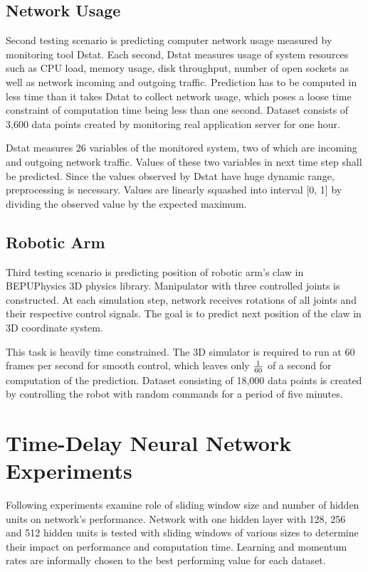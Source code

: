 \documentclass[12pt,oneside]{fithesis2}
\begin{document}
\subsection{Network Usage}
Second testing scenario is predicting computer network usage measured by monitoring tool Dstat. Each second, Dstat measures usage of system resources such as CPU load, memory usage, disk throughput, number of open sockets as well as network incoming and outgoing traffic. Prediction has to be computed in less time than it takes Dstat to collect network usage, which poses a loose time constraint of computation time being less than one second. Dataset consists of 3,600 data points created by monitoring real application server for one hour.\par
Dstat measures 26 variables of the monitored system, two of which are incoming and outgoing network traffic. Values of these two variables in next time step shall be predicted. Since the values observed by Dstat have huge dynamic range, preprocessing is necessary. Values are linearly squashed into interval [0, 1] by dividing the observed value by the expected maximum.
\subsection{Robotic Arm}
Third testing scenario is predicting position of robotic arm's claw in BEPUPhysics 3D physics library. Manipulator with three controlled joints is constructed. At each simulation step, network receives rotations of all joints and their respective control signals. The goal is to predict next position of the claw in 3D coordinate system.\par
This task is heavily time constrained. The 3D simulator is required to run at 60 frames per second for smooth control, which leaves only $1 \over 60$ of a second for computation of the prediction. Dataset consisting of 18,000 data points is created by controlling the robot with random commands for a period of five minutes.

\section{Time-Delay Neural Network Experiments}
Following experiments examine role of sliding window size and number of hidden units on network's performance. Network with one hidden layer with 128, 256 and 512 hidden units is tested with sliding windows of various sizes to determine their impact on performance and computation time. Learning and momentum rates are informally chosen to the best performing value for each dataset.
\end{document}
